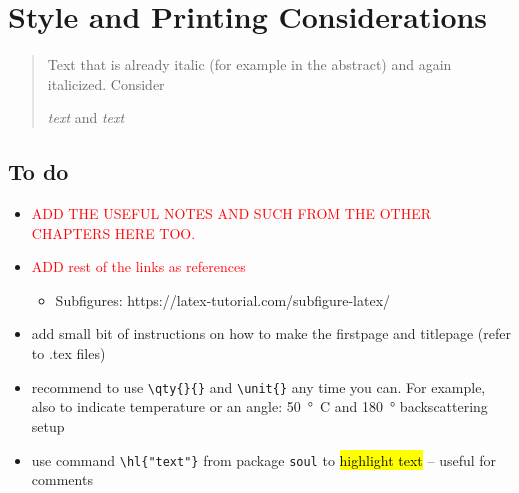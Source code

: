 \documentclass[main_brownies.tex]{subfiles}
\begin{document}
\graphicspath{ {Figures/}{Schemes/} } %
{}%

\checkoddpage
\ifoddpage
\newpage\thispagestyle{empty}
\mbox{}
\newpage
\else
\fi

\chapter[Instructions]{Style and Printing Considerations} %
	
\begin{abstract}
	Text that is already italic (for example in the abstract) and again italicized. Consider 
	\begin{LTXexample}[pos=b,preset=\centering,width=0.5\linewidth]
		\textit{text} and \emph{text}
	\end{LTXexample}
\end{abstract}

\section{To do}
\begin{itemize}
	\item \textcolor{red}{ADD THE USEFUL NOTES AND SUCH FROM THE OTHER CHAPTERS HERE TOO.}
	\item \textcolor{red}{ADD rest of the links as references}
	\begin{itemize}
		\item Subfigures: https://latex-tutorial.com/subfigure-latex/
	\end{itemize}
	\item add small bit of instructions on how to make the firstpage and titlepage (refer to .tex files)
	\item recommend to use \verb*|\qty{}{}| and \verb*|\unit{}| any time you can. For example, also to indicate temperature or an angle: \qty{50}{\degree C} and \qty{180}{\degree} backscattering setup
	\item use command \verb*|\hl{"text"}| from package \verb*|soul| to \hl{highlight text} -- useful for comments
\end{itemize}
\end{document}
